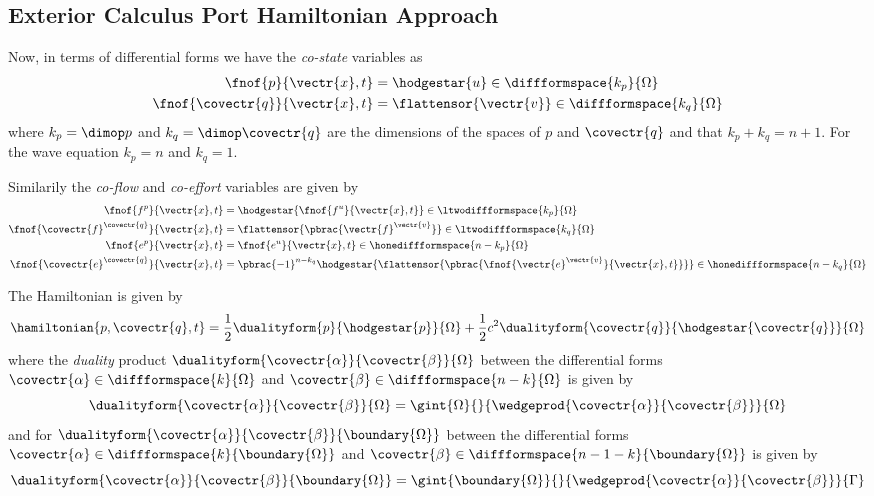 \subsection{Exterior Calculus Port Hamiltonian Approach}

Now, in terms of differential forms we have the \emph{co-state} variables as
\begin{equation}
  \begin{aligned}
    \fnof{p}{\vectr{x},t}&=\hodgestar{u}\in\diffformspace{k_{p}}{\Omega} \\
    \fnof{\covectr{q}}{\vectr{x},t}&=\flattensor{\vectr{v}}\in\diffformspace{k_{q}}{\Omega}
  \end{aligned}
\end{equation}
where $k_{p}=\dimop p$ and $k_{q}=\dimop \covectr{q}$ are the dimensions of the spaces of $p$ and $\covectr{q}$ and
that $k_{p}+k_{q}=n+1$. For the wave equation $k_{p}=n$ and $k_{q}=1$.

Similarily the \emph{co-flow} and \emph{co-effort} variables are given by
\begin{equation}
  \begin{aligned}
    \fnof{f^{p}}{\vectr{x},t}&=\hodgestar{\fnof{f^{u}}{\vectr{x},t}}\in\ltwodiffformspace{k_{p}}{\Omega}\\
    \fnof{\covectr{f}^{\covectr{q}}}{\vectr{x},t}&=\flattensor{\pbrac{\vectr{f}^{\vectr{v}}}}\in\ltwodiffformspace{k_{q}}{\Omega}\\
    \fnof{e^{p}}{\vectr{x},t}&=\fnof{e^{u}}{\vectr{x},t}\in\honediffformspace{n-k_{p}}{\Omega}\\
    \fnof{\covectr{e}^{\covectr{q}}}{\vectr{x},t}&=\pbrac{-1}^{n-k_{q}}\hodgestar{\flattensor{\pbrac{\fnof{\vectr{e}^{\vectr{v}}}{\vectr{x},t}}}}\in\honediffformspace{n-k_{q}}{\Omega}
  \end{aligned} 
\end{equation}

The Hamiltonian is given by
\begin{equation}
  \hamiltonian{p,\covectr{q},t}=\dfrac{1}{2}\dualityform{p}{\hodgestar{p}}{\Omega}+\dfrac{1}{2}c^{2}\dualityform{\covectr{q}}{\hodgestar{\covectr{q}}}{\Omega}
\end{equation}
where the \emph{duality} product
$\dualityform{\covectr{\alpha}}{\covectr{\beta}}{\Omega}$ between the differential
forms $\covectr{\alpha}\in\diffformspace{k}{\Omega}$ and
$\covectr{\beta}\in\diffformspace{n-k}{\Omega}$ is given by
\begin{equation}
  \dualityform{\covectr{\alpha}}{\covectr{\beta}}{\Omega}=\gint{\Omega}{}{\wedgeprod{\covectr{\alpha}}{\covectr{\beta}}}{\Omega}
\end{equation}
and for $\dualityform{\covectr{\alpha}}{\covectr{\beta}}{\boundary{\Omega}}$
between the differential forms $\covectr{\alpha}\in\diffformspace{k}{\boundary{\Omega}}$ and
$\covectr{\beta}\in\diffformspace{n-1-k}{\boundary{\Omega}}$ is given by
\begin{equation}
  \dualityform{\covectr{\alpha}}{\covectr{\beta}}{\boundary{\Omega}}=\gint{\boundary{\Omega}}{}{\wedgeprod{\covectr{\alpha}}{\covectr{\beta}}}{\Gamma}
\end{equation}

